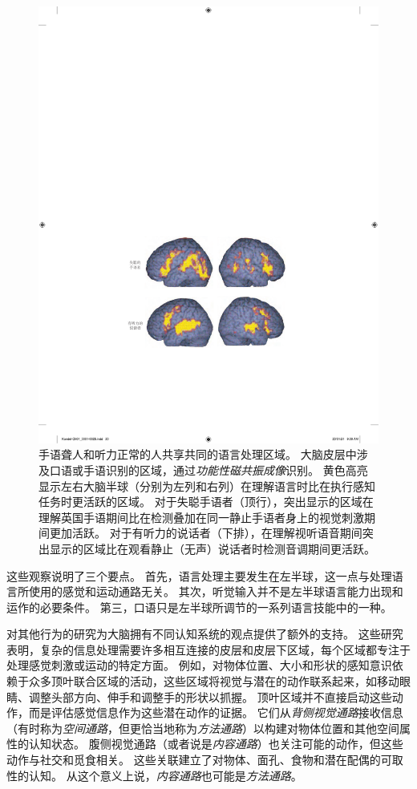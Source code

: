 \begin{figure}[htbp]
	\centering
	\includegraphics[width=0.82\linewidth]{chap01/fig_1_8}
	\caption{手语聋人和听力正常的人共享共同的语言处理区域。
		大脑皮层中涉及口语或手语识别的区域，通过\textit{功能性磁共振成像}识别。
		黄色高亮显示左右大脑半球（分别为左列和右列）在理解语言时比在执行感知任务时更活跃的区域。
		对于失聪手语者（顶行），突出显示的区域在理解英国手语期间比在检测叠加在同一静止手语者身上的视觉刺激期间更加活跃。
		对于有听力的说话者（下排），在理解视听语音期间突出显示的区域比在观看静止（无声）说话者时检测音调期间更活跃\cite{macsweeney2002neural}。}
	\label{fig:1_8}
\end{figure}


这些观察说明了三个要点。
首先，语言处理主要发生在左半球，这一点与处理语言所使用的感觉和运动通路无关。
其次，听觉输入并不是左半球语言能力出现和运作的必要条件。
第三，口语只是左半球所调节的一系列语言技能中的一种。



对其他行为的研究为大脑拥有不同认知系统的观点提供了额外的支持。
这些研究表明，复杂的信息处理需要许多相互连接的皮层和皮层下区域，每个区域都专注于处理感觉刺激或运动的特定方面。
例如，对物体位置、大小和形状的感知意识依赖于众多顶叶联合区域的活动，这些区域将视觉与潜在的动作联系起来，如移动眼睛、调整头部方向、伸手和调整手的形状以抓握。
顶叶区域并不直接启动这些动作，而是评估感觉信息作为这些潜在动作的证据。
它们从\textit{背侧视觉通路}接收信息（有时称为\textit{空间通路}，但更恰当地称为\textit{方法通路}）以构建对物体位置和其他空间属性的认知状态。
腹侧视觉通路（或者说是\textit{内容通路}）也关注可能的动作，但这些动作与社交和觅食相关。
这些关联建立了对物体、面孔、食物和潜在配偶的可取性的认知。
从这个意义上说，\textit{内容通路}也可能是\textit{方法通路}。



